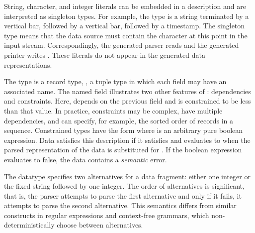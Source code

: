 \documentclass{sigplanconf}
\begin{document}
String, character, and integer literals can be embedded in a
description and are interpreted as singleton types.  For example, the
 type is a string terminated by a vertical bar, followed by
a vertical bar, followed by a timestamp.  The singleton type 
means that the data source must contain the character  at this
point in the input stream. Correspondingly, the generated parser reads
 and the generated printer writes .  These literals do
not appear in the generated data representations.

The type  is a record type, \ie{}, a tuple type in
which each field may have an associated name.  The named field
 illustrates two other features of
\padsml: dependencies and constraints.  Here, 
depends on the previous field  and is constrained to be
less than that value.  In practice, constraints may be complex, have
multiple dependencies, and can specify, for example, the sorted order
of records in a sequence.  Constrained types have the form \cd{[x:T |
e]} where  is an arbitrary pure boolean expression.  Data
satisfies this description if it satisfies  and 
evaluates to  when the parsed representation of the data is
substituted for .  If the boolean expression evaluates to false,
the data contains a \textit{semantic} error.

The datatype  specifies two
alternatives for a data fragment: either one integer or the fixed
string  followed by one integer.  The order of
alternatives is significant, that is, the parser attempts to parse the
first alternative and only if it fails, it attempts to parse the
second alternative.  This semantics differs from similar constructs in
regular expressions and context-free grammars, which
non-deterministically choose between alternatives.
\end{document}
